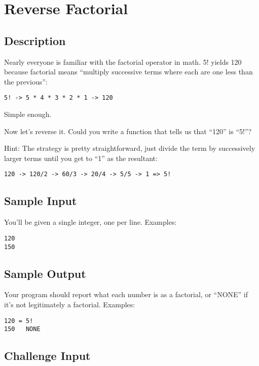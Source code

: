 \section{Reverse Factorial}

\subsection*{Description}\label{description-37}

Nearly everyone is familiar with the factorial operator in math. 5!
yields 120 because factorial means ``multiply successive terms where
each are one less than the previous'':

\begin{lstlisting}
5! -> 5 * 4 * 3 * 2 * 1 -> 120
\end{lstlisting}

Simple enough.

Now let's reverse it. Could you write a function that tells us that
``120'' is ``5!''?

Hint: The strategy is pretty straightforward, just divide the term by
successively larger terms until you get to ``1'' as the resultant:

\begin{lstlisting}
120 -> 120/2 -> 60/3 -> 20/4 -> 5/5 -> 1 => 5!
\end{lstlisting}

\subsection*{Sample Input}\label{sample-input-3}

You'll be given a single integer, one per line. Examples:

\begin{lstlisting}
120
150
\end{lstlisting}

\subsection*{Sample Output}\label{sample-output-3}

Your program should report what each number is as a factorial, or
``NONE'' if it's not legitimately a factorial. Examples:

\begin{lstlisting}
120 = 5!
150   NONE
\end{lstlisting}

\subsection*{Challenge Input}\label{challenge-input-31}

